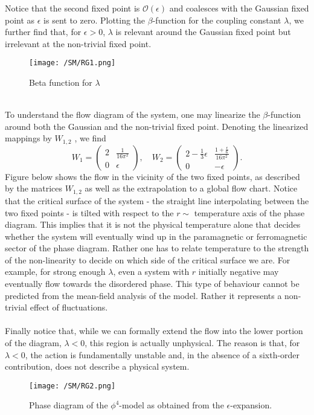 Notice that the second fixed point is $\mathcal{O}(\epsilon)$ and coalesces with the Gaussian fixed point as $\epsilon$ is sent to zero. Plotting the $\beta$-function for the coupling constant $\lambda$, we further find that, for $\epsilon > 0$, $\lambda$ is relevant around the Gaussian fixed point but irrelevant at the non-trivial fixed point.
\begin{figure}[!h]
\centering
\texttt{[image: /SM/RG1.png]}
\caption{Beta function for $\lambda$}
\end{figure}
\\
To understand the flow diagram of the system, one may linearize the $\beta$-function around both the Gaussian and the non-trivial fixed point. Denoting the linearized mappings by $W_{1,2}$ , we find
\[W_1 = \begin{pmatrix} 2 & \frac{1}{16\pi^2} \\ 0 & \epsilon \end{pmatrix} , \quad W_2 = \begin{pmatrix} 2 - \frac{1}{3}\epsilon & \frac{1+ \frac{\epsilon}{6}}{16\pi^2}\\  0 & -\epsilon \end{pmatrix} .\]
Figure below shows the flow in the vicinity of the two fixed points, as described by the matrices $W_{1,2}$ as well as the extrapolation to a global flow chart.
Notice that the critical surface of the system - the straight line interpolating between the two fixed points - is tilted with respect to the $r \sim$ temperature axis of the phase diagram. 
This implies that it is not the physical temperature alone that decides whether the system will eventually wind up in the paramagnetic or ferromagnetic sector of the phase diagram. 
Rather one has to relate temperature to the strength of the non-linearity to decide on which side of the critical surface we are. 
For example, for strong enough $\lambda$, even a system with $r$ initially negative may eventually flow towards the disordered phase. This type of behaviour cannot be predicted from the mean-field analysis of the model. Rather it represents a non-trivial effect of fluctuations.
\\ \\
Finally notice that, while we can formally extend the flow into the lower portion of the diagram, $\lambda < 0$, this region is actually unphysical. The reason is that, for $\lambda < 0$, the action is fundamentally unstable and, in the absence of a sixth-order contribution, does not describe
a physical system.
\begin{figure}[!h]
\centering
\texttt{[image: /SM/RG2.png]}
\caption{Phase diagram of the $\phi^4$-model as obtained from the $\epsilon$-expansion.}
\end{figure}
